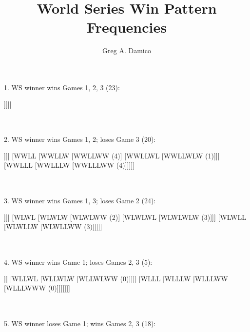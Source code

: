 \documentclass[11pt, oneside]{article}
\title{World Series Win Pattern Frequencies}
\author{Greg A. Damico}
\begin{document}
\maketitle
1. WS winner wins Games 1, 2, 3 (23):

\begin{forest}
		[WWW
			[WWWW (19)]
			[WWWL
				[WWWLW (4)]
				[WWWLL
					[WWWLLW (0)]
					[WWWLLL
						[WWWLLLW (0)]]]]]
\end{forest}
\\
\\

2. WS winner wins Games 1, 2; loses Game 3 (20):

\begin{forest}
		[WWL
			[WWLW
				[WWLWW (9)]
				[WWLWL
					[WWLWLW (1)]
					[WWLWLL
						[WWLWLLW (1)]]]]
			[WWLL
				[WWLLW
					[WWLLWW (4)]
					[WWLLWL
						[WWLLWLW (1)]]]
				[WWLLL
					[WWLLLW
						[WWLLLWW (4)]]]]]
\end{forest}
\\
\\

3. WS winner wins Games 1, 3; loses Game 2 (24):

\begin{forest}
		[WLW
			[WLWW
				[WLWWW (11)]
				[WLWWL
					[WLWWLW (4)]
					[WLWWLL
						[WLWWLLW (1)]]]]
			[WLWL
				[WLWLW
					[WLWLWW (2)]
					[WLWLWL
						[WLWLWLW (3)]]]
				[WLWLL
					[WLWLLW
						[WLWLLWW (3)]]]]]
\end{forest}
\\
\\

4. WS winner wins Game 1; loses Games 2, 3 (5):

\begin{forest}
		[WLL
			[WLLW
				[WLLWW
					[WLLWWW (2)]
					[WLLWWL
						[WLLWWLW (3)]]]
				[WLLWL
					[WLLWLW
						[WLLWLWW (0)]]]]
			[WLLL
				[WLLLW
					[WLLLWW
						[WLLLWWW (0)]]]]]]]
\end{forest}
\\
\\

5. WS winner loses Game 1; wins Games 2, 3 (18):
\end{document}
